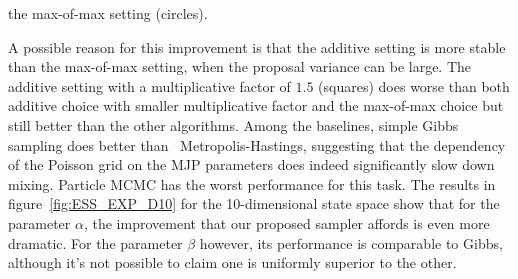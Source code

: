  the {max-of-max} setting (circles). {A possible reason for this improvement is 
  that the additive setting is more stable than the max-of-max setting, when the 
proposal variance can be large. The {additive setting with a multiplicative factor 
of $1.5$} (squares) does worse than both {additive choice with smaller multiplicative
factor and the max-of-max choice} but still better than the other algorithms. Among 
the baselines, simple Gibbs sampling 
does better than \naive\ Metropolis-Hastings, suggesting that the dependency of 
the Poisson grid on the MJP parameters does indeed significantly slow 
down mixing. Particle MCMC has the worst performance for this task. The
results in figure~\ref{fig:ESS_EXP_D10} for the 10-dimensional state space
show that for the parameter $\alpha$, the improvement that our proposed
sampler affords is even more dramatic. For the parameter $\beta$ however,
its performance is comparable to Gibbs, although it's not possible to
claim one is uniformly superior to the other.

}
